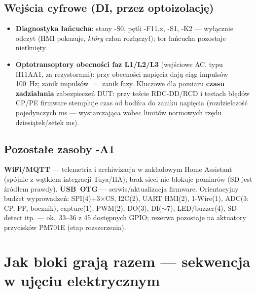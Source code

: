 \documentclass[11pt,a4paper]{article}
\begin{document}
\subsection{Wejścia cyfrowe (DI, przez optoizolację)}
\label{sec:di}
\begin{itemize}
\item \textbf{Diagnostyka łańcucha}: stany -S0, pętli -F11.x, -S1, -K2 --- wyłącznie odczyt
(HMI pokazuje, \emph{który} człon rozłączył); tor łańcucha pozostaje nietknięty.
\item \textbf{Optotransoptory obecności faz L1/L2/L3} (wejściowe AC, typu H11AA1, za rezystorami):
przy obecności napięcia dają ciąg impulsów 100~Hz; zanik impulsów $=$ zanik fazy. Kluczowe dla
pomiaru \textbf{czasu zadziałania} zabezpieczeń DUT: przy teście RDC-DD/RCD i testach błędów
CP/PE firmware stempluje czas od bodźca do zaniku napięcia (rozdzielczość pojedynczych ms ---
wystarczająca wobec limitów normowych rzędu dziesiątek/setek ms).
\end{itemize}

\subsection{Pozostałe zasoby -A1}
\textbf{WiFi/MQTT} --- telemetria i archiwizacja w zakładowym Home Assistant (spójnie z wątkiem
integracji Tuya/HA); brak sieci nie blokuje pomiarów (SD jest źródłem prawdy).
\textbf{USB~OTG} --- serwis/aktualizacja firmware. Orientacyjny budżet wyprowadzeń: SPI(4)+3$\times$CS,
I2C(2), UART HMI(2), 1-Wire(1), ADC(3: CP, PP, bocznik), capture(1), PWM(2), DO(3), DI($\sim$7),
LED/buzzer(4), SD-detect itp. --- ok.\ 33--36 z 45 dostępnych GPIO; rezerwa pozostaje na aktuatory
przycisków PM701E (etap rozszerzenia).

\section{Jak bloki grają razem --- sekwencja w ujęciu elektrycznym}
\label{sec:sekwencja}
\end{document}
